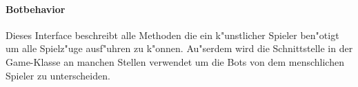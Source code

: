 \paragraph{Botbehavior}
\label{par:botbehavior}
Dieses Interface beschreibt alle Methoden die ein k"unstlicher Spieler ben"otigt um alle Spielz"uge ausf"uhren zu k"onnen. Au"serdem wird die Schnittstelle in der Game-Klasse an manchen Stellen verwendet um die Bots von dem menschlichen Spieler zu unterscheiden. 